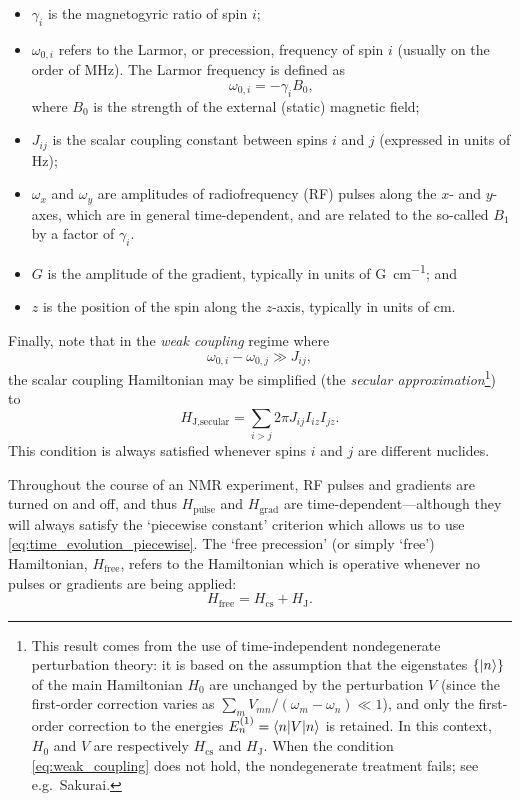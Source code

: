 \begin{itemize}
    \item $\gamma_i$ is the magnetogyric ratio of spin $i$;
    \item $\omega_{0,i}$ refers to the Larmor, or precession, frequency of spin $i$ (usually on the order of \unit{MHz}). The Larmor frequency is defined as
        \begin{equation}
            \label{eq:larmor_frequency}
            \omega_{0,i} = -\gamma_i B_0,
        \end{equation}
        where $B_0$ is the strength of the external (static) magnetic field;
    \item $J_{ij}$ is the scalar coupling constant between spins $i$ and $j$ (expressed in units of \unit{Hz});
    \item $\omega_x$ and $\omega_y$ are amplitudes of radiofrequency (RF) pulses along the $x$- and $y$-axes, which are in general time-dependent, and are related to the so-called $B_1$ by a factor of $\gamma_i$.
    \item $G$ is the amplitude of the gradient, typically in units of \unit{G\per\cm}; and
    \item $z$ is the position of the spin along the $z$-axis, typically in units of \unit{\cm}.
\end{itemize}

Finally, note that in the \textit{weak coupling} regime where
\begin{equation}
    \omega_{0,i} - \omega_{0,j} \gg J_{ij}, \label{eq:weak_coupling}
\end{equation}
the scalar coupling Hamiltonian may be simplified (the \textit{secular approximation}\footnote{This result comes from the use of time-independent nondegenerate perturbation theory: it is based on the assumption that the eigenstates $\{\ket{n}\}$ of the main Hamiltonian $H_0$ are unchanged by the perturbation $V$ (since the first-order correction varies as $\sum_m V_{mn}/(\omega_m - \omega_n) \ll 1$), and only the first-order correction to the energies $E_n^{(1)} = \braket{n | V | n}$ is retained. In this context, $H_0$ and $V$ are respectively $H_\text{cs}$ and $H_\text{J}$. When the condition \cref{eq:weak_coupling} does not hold, the nondegenerate treatment fails; see e.g.\ Sakurai\autocite{Sakurai2021}.}) to
\begin{equation}
    H_\text{J,secular} = \sum_{i > j} 2\pi J_{ij} I_{iz}I_{jz} \label{eq:h_j_secular}.
\end{equation}
This condition is always satisfied whenever spins $i$ and $j$ are different nuclides.

Throughout the course of an NMR experiment, RF pulses and gradients are turned on and off, and thus $H_\text{pulse}$ and $H_\text{grad}$ are time-dependent---although they will always satisfy the `piecewise constant' criterion which allows us to use \cref{eq:time_evolution_piecewise}.
The `free precession' (or simply `free') Hamiltonian, $H_\text{free}$, refers to the Hamiltonian which is operative whenever no pulses or gradients are being applied: 
\begin{equation}
    \label{eq:h_free}
    H_\text{free} = H_\text{cs} + H_\text{J}.
\end{equation}

